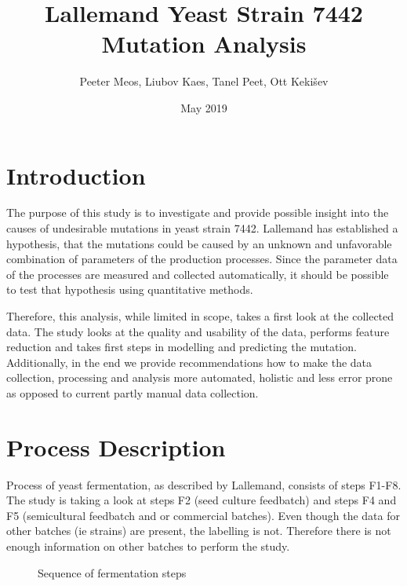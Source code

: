 \documentclass{article}
\title{Lallemand Yeast Strain 7442 Mutation Analysis}
\author{Peeter Meos, Liubov Kaes, Tanel Peet, Ott Keki{\v s}ev}
\affil{Proekspert AS}
\date{May 2019}
\begin{document}
\maketitle

\tableofcontents
\listoffigures

\section{Introduction}
The purpose of this study is to investigate and provide possible insight into the causes of undesirable mutations in yeast strain 7442. Lallemand has established a hypothesis, that the mutations could be caused by an unknown and unfavorable combination of parameters of the production processes. Since the parameter data  of the processes are measured and collected automatically, it should be possible to test that hypothesis using quantitative methods.

Therefore, this analysis, while limited in scope, takes a first look at the collected data. The study looks at the quality and usability of the data, performs feature reduction and takes first steps in modelling and predicting the mutation. Additionally, in the end we provide recommendations how to make the data collection, processing and analysis more automated, holistic and less error prone as opposed to current partly manual data collection.

\section{Process Description}
Process of yeast fermentation, as described by Lallemand, consists of steps F1-F8. The study is taking a look at steps F2 (seed culture feedbatch) and steps F4 and F5 (semicultural feedbatch and or commercial batches). Even though the data for other batches (ie strains) are present, the labelling is not. Therefore there is not enough information on other batches to perform the study.

\begin{figure}[ht]
    \centering
    \caption{Sequence of fermentation steps}
    \label{fig:process_steps}
\end{figure}
\end{document}
